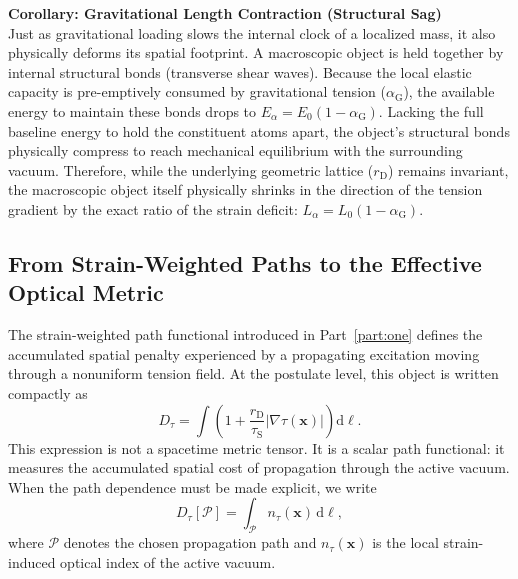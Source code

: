 \vspace{0.5em}
\noindent\textbf{Corollary: Gravitational Length Contraction (Structural Sag)}\\
Just as gravitational loading slows the internal clock of a localized mass, it also physically deforms its spatial footprint. A macroscopic object is held together by internal structural bonds (transverse shear waves). Because the local elastic capacity is pre-emptively consumed by gravitational tension ($\alpha_{\mathrm{G}}$), the available energy to maintain these bonds drops to $E_{\alpha} = E_0(1 - \alpha_{\mathrm{G}})$. Lacking the full baseline energy to hold the constituent atoms apart, the object's structural bonds physically compress to reach mechanical equilibrium with the surrounding vacuum. Therefore, while the underlying geometric lattice ($r_{\mathrm{D}}$) remains invariant, the macroscopic object itself physically shrinks in the direction of the tension gradient by the exact ratio of the strain deficit: $L_{\alpha} = L_0 (1 - \alpha_{\mathrm{G}})$.

\subsection{From Strain-Weighted Paths to the Effective Optical Metric}
\label{sec:optical_metric}
The strain-weighted path functional introduced in Part~\ref{part:one} defines the accumulated spatial penalty experienced by a propagating excitation moving through a nonuniform tension field. At the postulate level, this object is written compactly as
\begin{equation}
    D_\tau = \int \left( 1 + \frac{r_{\mathrm{D}}}{\tau_{\mathrm{S}}} |\nabla\tau(\mathbf{x})| \right) \mathrm{d}\ell .
\end{equation}
This expression is not a spacetime metric tensor. It is a scalar path functional: it measures the accumulated spatial cost of propagation through the active vacuum. When the path dependence must be made explicit, we write
\begin{equation}
    D_\tau[\mathcal{P}] = \int_{\mathcal{P}} n_\tau(\mathbf{x}) \, \mathrm{d}\ell ,
\end{equation}
where $\mathcal{P}$ denotes the chosen propagation path and $n_\tau(\mathbf{x})$ is the local strain-induced optical index of the active vacuum.

